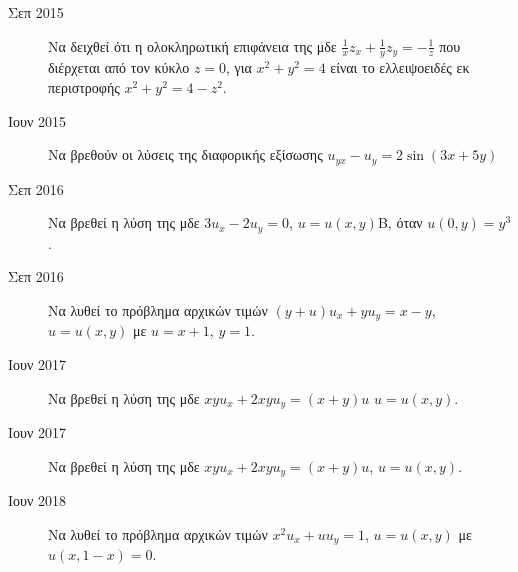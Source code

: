 


\thispagestyle{empty}



\begin{center}
\end{center}

\vspace{\baselineskip}

\begin{description}

\item[Σεπ 2015] Να δειχθεί ότι η ολοκληρωτική επιφάνεια της μδε $\frac{1}{x}z_{x}+\frac{1}{y}z_{y}=-\frac{1}{z}$ που διέρχεται από τον κύκλο $z=0$, για $x^{2}+y^{2}=4$ είναι το ελλειψοειδές εκ περιστροφής $x^{2}+y^{2}=4-z^{2}$.

\item[Ιουν 2015] Να βρεθούν οι λύσεις της διαφορικής εξίσωσης $u_{yx}-u_{y}=2\sin(3x+5y)$


\item[Σεπ 2016] Να βρεθεί η λύση της μδε $3u_{x}-2u_{y}=0$, $u=u(x,y)$B, όταν $u(0,y)=y^{3}$.

\item[Σεπ 2016] Να λυθεί το πρόβλημα αρχικών τιμών $(y+u)u_{x}+yu_{y}=x-y$, $u=u(x,y)$ με $u=x+1$, $y=1$.

\item[Ιουν 2017] Να βρεθεί η λύση της μδε $xyu_{x}+2xyu_{y}=(x+y)u$ $u=u(x,y)$.

\item[Ιουν 2017] Να βρεθεί η λύση της μδε $xyu_{x}+2xyu_{y}=(x+y)u$, $u=u(x,y)$.

\item[Ιουν 2018] Να λυθεί το πρόβλημα αρχικών τιμών $x^{2}u_{x}+uu_{y}=1$, $u=u(x,y)$ με $u(x,1-x)=0$.

\end{description}


